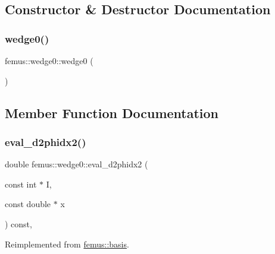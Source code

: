 \subsection{Constructor \& Destructor Documentation}
\mbox{\label{classfemus_1_1wedge0_abd8e339f84098255d9f7917b13349049}} 
\subsubsection{\texorpdfstring{wedge0()}{wedge0()}}
{\footnotesize\ttfamily femus\+::wedge0\+::wedge0 (\begin{DoxyParamCaption}{ }\end{DoxyParamCaption})\hspace{0.3cm}{\ttfamily [inline]}}



\subsection{Member Function Documentation}
\mbox{\label{classfemus_1_1wedge0_ab6d8e56e02ffedc90f9630db2dd37427}} 
\subsubsection{\texorpdfstring{eval\+\_\+d2phidx2()}{eval\_d2phidx2()}}
{\footnotesize\ttfamily double femus\+::wedge0\+::eval\+\_\+d2phidx2 (\begin{DoxyParamCaption}\item[{const int $\ast$}]{I,  }\item[{const double $\ast$}]{x }\end{DoxyParamCaption}) const\hspace{0.3cm}{\ttfamily [inline]}, {\ttfamily [virtual]}}



Reimplemented from \mbox{\hyperlink{classfemus_1_1basis_a0a9839e75d1c9c8302486fc072eed028}{femus\+::basis}}.

\mbox{\label{classfemus_1_1wedge0_a2453f7ad8629c94abf9001ac43eb495f}} 
